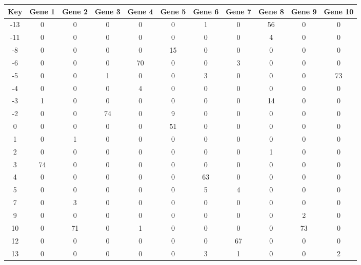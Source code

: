 \begin{tabular}{|c|c|c|c|c|c|c|c|c|c|c|}
\hline
Key & Gene 1 & Gene 2 & Gene 3 & Gene 4 & Gene 5 & Gene 6 & Gene 7 & Gene 8 & Gene 9 & Gene 10 \\
\hline
-13 & 0 & 0 & 0 & 0 & 0 & 1 & 0 & 56 & 0 & 0 \\
-11 & 0 & 0 & 0 & 0 & 0 & 0 & 0 & 4 & 0 & 0 \\
-8 & 0 & 0 & 0 & 0 & 15 & 0 & 0 & 0 & 0 & 0 \\
-6 & 0 & 0 & 0 & 70 & 0 & 0 & 3 & 0 & 0 & 0 \\
-5 & 0 & 0 & 1 & 0 & 0 & 3 & 0 & 0 & 0 & 73 \\
-4 & 0 & 0 & 0 & 4 & 0 & 0 & 0 & 0 & 0 & 0 \\
-3 & 1 & 0 & 0 & 0 & 0 & 0 & 0 & 14 & 0 & 0 \\
-2 & 0 & 0 & 74 & 0 & 9 & 0 & 0 & 0 & 0 & 0 \\
0 & 0 & 0 & 0 & 0 & 51 & 0 & 0 & 0 & 0 & 0 \\
1 & 0 & 1 & 0 & 0 & 0 & 0 & 0 & 0 & 0 & 0 \\
2 & 0 & 0 & 0 & 0 & 0 & 0 & 0 & 1 & 0 & 0 \\
3 & 74 & 0 & 0 & 0 & 0 & 0 & 0 & 0 & 0 & 0 \\
4 & 0 & 0 & 0 & 0 & 0 & 63 & 0 & 0 & 0 & 0 \\
5 & 0 & 0 & 0 & 0 & 0 & 5 & 4 & 0 & 0 & 0 \\
7 & 0 & 3 & 0 & 0 & 0 & 0 & 0 & 0 & 0 & 0 \\
9 & 0 & 0 & 0 & 0 & 0 & 0 & 0 & 0 & 2 & 0 \\
10 & 0 & 71 & 0 & 1 & 0 & 0 & 0 & 0 & 73 & 0 \\
12 & 0 & 0 & 0 & 0 & 0 & 0 & 67 & 0 & 0 & 0 \\
13 & 0 & 0 & 0 & 0 & 0 & 3 & 1 & 0 & 0 & 2 \\
\hline
\end{tabular}